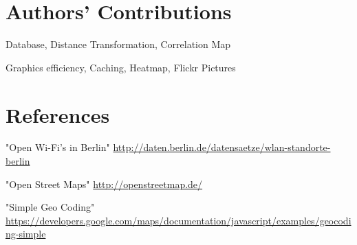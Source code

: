 \section*{Authors' Contributions}

\begin{description}
\setlength{\itemsep}{0pt}
  \item[Andreas Ergenzinger] Database, Distance Transformation, Correlation Map
  \item[Josua Krause] Graphics efficiency, Caching, Heatmap, Flickr Pictures
\end{description}

\section*{References}

\begin{description}
\setlength{\itemsep}{0pt}
\item[Wi-Fi Positions.] "Open Wi-Fi's in Berlin" 
  \url{http://daten.berlin.de/datensaetze/wlan-standorte-berlin}
\item[OSM.] "Open Street Maps" 
  \url{http://openstreetmap.de/}
\item[Google-Maps API.] "Simple Geo Coding"
  \url{https://developers.google.com/maps/documentation/javascript/examples/geocoding-simple} 
\end{description}

